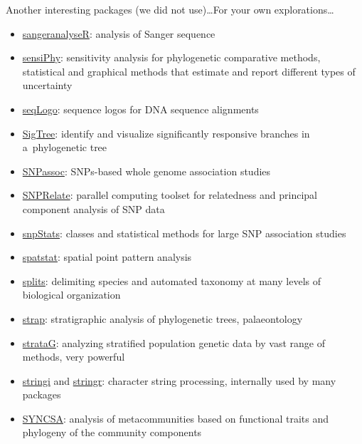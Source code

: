 \documentclass[compress, xelatex, 11pt, xcolor=svgnames, aspectratio=169,
	hyperref={
		bookmarks=true,
		unicode=true,
		colorlinks=true,
		pdftitle={Molecular data in R},
		plainpages=false,
		pdfauthor={Vojtech Zeisek},
		pdfsubject={Course about phylogeny and evolution in R},
		pdfcreator={XeLaTeX},
		pdfkeywords={R, evolution, phylogeny, molecular data},
		linkcolor=Crimson, %
		anchorcolor=Magenta, %
		citecolor=Magenta, %
		filecolor=Magenta, %
		menucolor=Magenta, %
		urlcolor=DodgerBlue, %
		},
	url={hyphens, lowtilde} %
	]{beamer}
\begin{document}
\begin{frame}[allowframebreaks]{Another interesting packages (we did not use)\ldots}{For your own explorations\ldots}
\begin{itemize}
		\item \href{https://bioconductor.org/packages/release/bioc/html/sangeranalyseR.html}{sangeranalyseR}: analysis of Sanger sequence
		\item \href{https://CRAN.R-project.org/package=sensiPhy}{sensiPhy}: sensitivity analysis for phylogenetic comparative methods,  statistical and graphical methods that estimate and report different types of uncertainty
		\item \href{https://www.bioconductor.org/packages/release/bioc/html/seqLogo.html}{seqLogo}: sequence logos for DNA sequence alignments
		\item \href{https://CRAN.R-project.org/package=SigTree}{SigTree}: identify and visualize significantly responsive branches in a~phylogenetic tree
		\item \href{https://CRAN.R-project.org/package=SNPassoc}{SNPassoc}: SNPs-based whole genome association studies
		\item \href{https://www.bioconductor.org/packages/release/bioc/html/SNPRelate.html}{SNPRelate}: parallel computing toolset for relatedness and principal component analysis of SNP data
		\item \href{https://bioconductor.org/packages/release/bioc/html/snpStats.html}{snpStats}: classes and statistical methods for large SNP association studies
		\item \href{https://CRAN.R-project.org/package=spatstat}{spatstat}: spatial point pattern analysis
		\item \href{https://r-forge.r-project.org/projects/splits/}{splits}: delimiting species and automated taxonomy at many levels of biological organization
		\item \href{https://CRAN.R-project.org/package=strap}{strap}: stratigraphic analysis of phylogenetic trees, palaeontology
		\item \href{https://github.com/cran/strataG}{strataG}: analyzing stratified population genetic data by vast range of methods, very powerful
		\item \href{https://CRAN.R-project.org/package=stringi}{stringi} and \href{https://CRAN.R-project.org/package=stringr}{stringr}: character string processing, internally used by many packages
		\item \href{https://CRAN.R-project.org/package=SYNCSA}{SYNCSA}: analysis of metacommunities based on functional traits and phylogeny of the community components

\end{itemize}
\end{frame}
\end{document}
